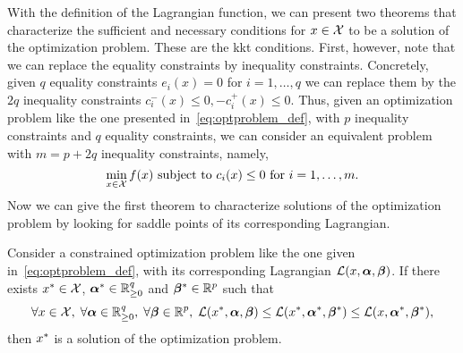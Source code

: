 With the definition of the Lagrangian function, we can present two theorems that characterize the sufficient and necessary conditions for $x \in \mathcal{X}$ to be a solution of the optimization problem. These are the \acrfull{kkt} conditions.
%
First, however, note that we can replace the equality constraints by inequality constraints. Concretely, given $q$ equality constraints $e_i(x)=0$ for $i=1, \ldots, q$ we can replace them by the $2q$ inequality constraints 
$c_i^-(x) \leq 0, -c_i^+(x) \leq 0$.
%
Thus, given an optimization problem like the one presented in~\eqref{eq:optproblem_def}, with $p$ inequality constraints and $q$ equality constraints, we can consider an equivalent problem with $m = p + 2q$ inequality constraints, namely,
\begin{equation}
    \nonumber
    \min_{x \in \mathcal{X}} f(x) \text{ subject to } c_i(x) \leq 0 \text{ for } i=1, \ldots, m .
\end{equation}
%
Now we can give the first theorem to characterize solutions of the optimization problem by looking for saddle points of its corresponding Lagrangian.
\begin{theorem}\label{th:kkt_saddlepoint}
    Consider a constrained optimization problem like the one given in~\eqref{eq:optproblem_def}, with its corresponding Lagrangian $\mathcal{L}(x, \bm{\alpha}, \bm{\beta})$. If there exists ${x}^* \in \mathcal{X}$, ${\bm{\alpha}}^* \in \mathbb{R}_{\geq 0}^q$ and ${\bm{\beta}}^* \in \mathbb{R}^p$ such that 
    \begin{equation}
        \label{eq:saddle_point}
        \forall x \in \vecspace,\;  \forall \fv{\alpha} \in \reals_{\geq 0}^q,\; \forall \fv{\beta} \in \reals^p,\; \lagr(\opt{x}, \fv{\alpha}, \fv{\beta}) \leq \lagr(\opt{x}, \opt{\fv{\alpha}}, \opt{\fv{\beta}}) \leq \lagr(x, \opt{\fv{\alpha}}, \opt{\fv{\beta}}),
    \end{equation}
    then ${x}^*$ is a solution of the optimization problem.
\end{theorem}

